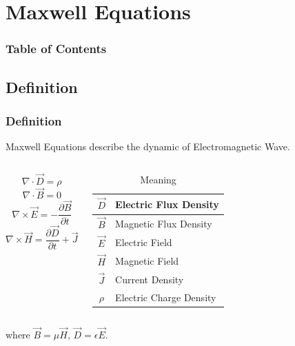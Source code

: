 \documentclass{beamer}
\begin{document}
\section{Maxwell Equations}

\begin{frame}
    \frametitle{Table of Contents}
\end{frame}

\subsection{Definition}
\begin{frame}
    \frametitle{Definition}
    Maxwell Equations describe the dynamic of Electromagnetic Wave.
    \begin{columns}

        \begin{equation}
            \nabla \cdot \vec{D} = \rho
            \label{eq: me D}
        \end{equation}
        \begin{equation}
            \nabla \cdot \vec{B} = 0
            \label{eq: me B}
        \end{equation}
        \begin{equation}
            \nabla \times \vec{E} = - \frac{\partial{\vec{B}}}{\partial{t}}
            \label{eq: me E}
        \end{equation}
        \begin{equation}
            \nabla \times \vec{H} = \frac{\partial{\vec{D}}}{\partial{t}} + \vec{J}
            \label{eq: me H}
        \end{equation}

        \begin{table}[h]
            \centering
            \caption{Meaning}
            \begin{tabular}{|c|l|}
                \hline
                $\vec{D}$ & Electric Flux Density   \\\hline
                $\vec{B}$ & Magnetic Flux Density   \\\hline
                $\vec{E}$ & Electric Field          \\\hline
                $\vec{H}$ & Magnetic Field          \\\hline
                $\vec{J}$ & Current Density         \\\hline
                $\rho$    & Electric Charge Density \\
                \hline
            \end{tabular}
        \end{table}

    \end{columns}

    \vspace{5mm}
    where $\vec{B} = \mu \vec{H}$, $\vec{D} = \epsilon \vec{E}$.
\end{frame}
\end{document}
